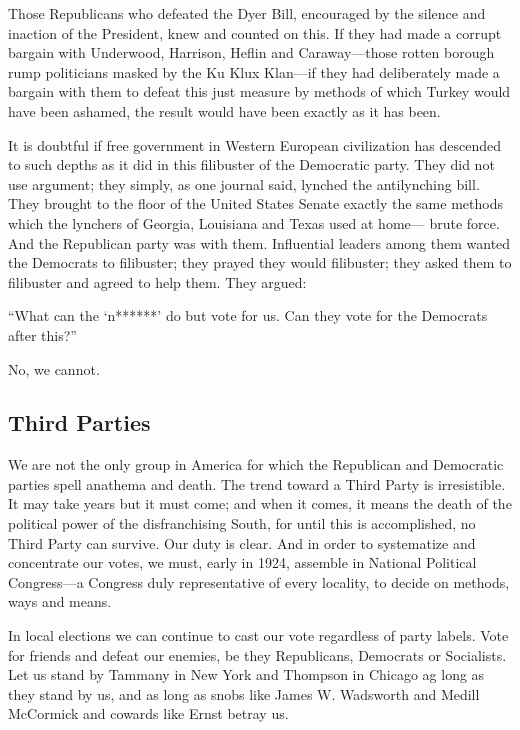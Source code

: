 \documentclass[letterpaper,10pt,english]{jupyterBook}
\begin{document}
\sphinxAtStartPar
Those Republicans who defeated the Dyer Bill, encouraged by the silence and inaction of the President, knew and counted on this. If they had made a corrupt bargain with Underwood, Harrison, Heflin and Caraway—those rotten borough rump politicians masked by the Ku Klux Klan—if they had deliberately made a bargain with them to defeat this just measure by methods of which Turkey would have been ashamed, the result would have been exactly as it has been.

\sphinxAtStartPar
It is doubtful if free government in Western European civilization has descended to such depths as it did in this filibuster of the Democratic party. They did not use argument; they simply, as one journal said, lynched the anti\sphinxhyphen{}lynching bill. They brought to the floor of the United States Senate exactly the same methods which the lynchers of Georgia, Louisiana and Texas used at home— brute force. And the Republican party was  with them. Influential leaders among them  wanted the Democrats to filibuster; they prayed they would filibuster; they asked them to filibuster and agreed to help them. They argued:

\sphinxAtStartPar
“What can the ‘n******’ do but vote for us. Can they vote for the Democrats after this?”

\sphinxAtStartPar
No, we cannot.


\subsection{Third Parties}
\label{\detokenize{Volumes/24/03/intentions:third-parties}}
\sphinxAtStartPar
We are not the only group in America for which the Republican and Democratic parties spell anathema and death. The trend toward a Third Party is irresistible. It may take years but it must come; and when it comes, it means the death of the political power of the disfranchising South, for until this is accomplished, no Third Party can survive. Our duty is clear. And in order to systematize and concentrate our votes, we must, early in 1924, assemble in National Political Congress—a Congress duly representative of every locality, to decide on methods, ways and means.

\sphinxAtStartPar
In local elections we can continue to cast our vote regardless of party labels. Vote for friends and defeat our enemies, be they Republicans, Democrats or Socialists. Let us stand by Tammany in New York and Thompson in Chicago ag long as they stand by us, and as long as snobs like James W. Wadsworth and Medill McCormick and cowards like Ernst betray us.
\end{document}
